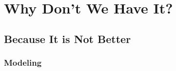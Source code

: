 
\chapter[Why Not?]{Why Don't We Have It?}\label{chap:no-better-tax}




\section{Because It is Not Better}




\subsection{Modeling}



